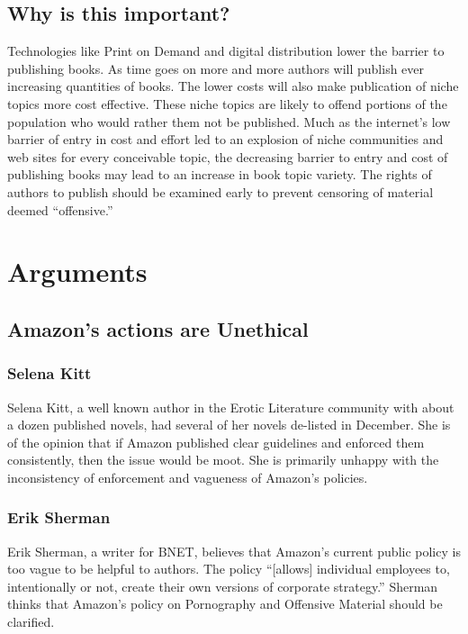 \documentclass[11pt]{article}
\begin{document}
\begin{multicols}{2}
\subsection{Why is this important?}

Technologies like Print on Demand and digital distribution lower the barrier to publishing books.  As time goes on more and more authors will publish ever increasing quantities of books.  The lower costs will also make publication of niche topics more cost effective.  These niche topics are likely to offend portions of the population who would rather them not be published.  Much as the internet's low barrier of entry in cost and effort led to an explosion of niche communities and web sites for every conceivable topic, the decreasing barrier to entry and cost of publishing books may lead to an increase in book topic variety.  The rights of authors to publish should be examined early to prevent censoring of material deemed ``offensive.''

\section{Arguments}

\subsection{Amazon's actions are Unethical}

\subsubsection{Selena Kitt}

Selena Kitt, a well known author in the Erotic Literature community with about a dozen published novels, had several of her novels de-listed in December.  She is of the opinion that if Amazon published clear guidelines and enforced them consistently, then the issue would be moot.  She is primarily unhappy with the inconsistency of enforcement and vagueness of Amazon's policies. \cite{KittSelfPubRevolution}

\subsubsection{Erik Sherman}

Erik Sherman, a writer for BNET, believes that Amazon's current public policy is too vague to be helpful to authors.  The policy  ``[allows] individual employees to, intentionally or not, create their own versions of corporate strategy.'' \cite{ShermanAmazonExecs} Sherman thinks that Amazon's policy on Pornography and Offensive Material should be clarified.


\end{multicols}
\end{document}
